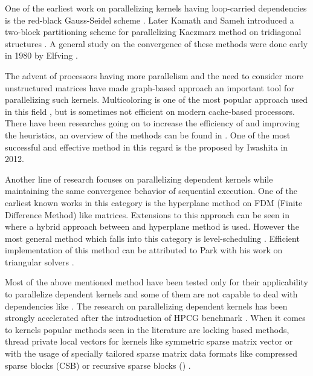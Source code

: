 One of the earliest work on parallelizing kernels having loop-carried dependencies is the red-black Gauss-Seidel scheme \cite{RBGS}. Later Kamath and Sameh introduced a two-block partitioning scheme for parallelizing Kaczmarz method on tridiagonal structures \cite{Kamath}. A general study on the convergence of these methods were done early in 1980 by Elfving \cite{Elfving1980}.

The advent of processors having more parallelism and the need to consider more unstructured matrices have made graph-based approach an important tool for parallelizing such kernels. Multicoloring is one of the most popular approach used in this field \cite{MC}, but is sometimes not efficient on modern cache-based processors. There have been researches going on to increase the efficiency of \MCfull and improving the heuristics, an overview of the methods can be found in \cite{equitable_color,dist_k_def,COLPACK}. One of the most successful and effective method in this regard is the \ABMCfull \cite{ABMC} proposed by Iwashita \etal in 2012.

Another line of research focuses on parallelizing dependent kernels while maintaining the same convergence behavior of sequential execution. One of the earliest known works in this category is the hyperplane method \cite{saad} on FDM (Finite Difference Method) like matrices. Extensions to this approach can be seen in \cite{cm-rcm} where a hybrid approach between \MCfull and hyperplane method is used. However the most general method which falls into this category is level-scheduling \cite{saad}.  Efficient implementation of this method can be attributed to Park \etal with his work on triangular solvers \cite{park_ls}.

Most of the above mentioned method have been tested only for their applicability to parallelize \DONE dependent kernels and some of them are not capable to deal with dependencies like \DTWO. The research on parallelizing \DONE dependent kernels has been strongly accelerated after the introduction of HPCG benchmark \cite{hpcg}. When it comes to \DTWO kernels popular methods seen in the literature are locking based methods, thread private local vectors \cite{thread_private_symm_spmv,sparseX} for kernels like symmetric sparse matrix vector or with the usage of specially tailored sparse matrix data formats like compressed sparse blocks (CSB) \cite{CSB} or recursive sparse blocks (\RSB) \cite{RSB}.